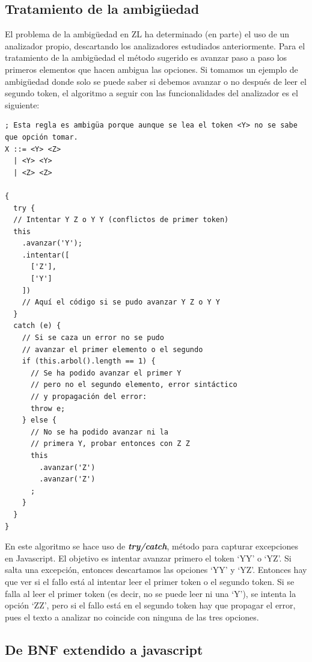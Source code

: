 \documentclass{report}
\begin{document}
	\subsection{Tratamiento de la ambigüedad}
	
	El problema de la ambigüedad en ZL ha determinado (en parte) el uso de un analizador propio, descartando los analizadores estudiados anteriormente. Para el tratamiento de la ambigüedad el método sugerido es avanzar paso a paso los primeros elementos que hacen ambigua las opciones. Si tomamos un ejemplo de ambigüedad donde solo se puede saber si debemos avanzar o no después de leer el segundo token, el algoritmo a seguir con las funcionalidades del analizador es el siguiente:
	
\begin{BVerbatim}
; Esta regla es ambigüa porque aunque se lea el token <Y> no se sabe que opción tomar.
X ::= <Y> <Z>
  | <Y> <Y>
  | <Z> <Z>

{
  try {
  // Intentar Y Z o Y Y (conflictos de primer token)
  this
    .avanzar('Y');
    .intentar([
      ['Z'],
      ['Y']
    ])
    // Aquí el código si se pudo avanzar Y Z o Y Y
  }
  catch (e) {
    // Si se caza un error no se pudo 
    // avanzar el primer elemento o el segundo
    if (this.arbol().length == 1) {
      // Se ha podido avanzar el primer Y 
      // pero no el segundo elemento, error sintáctico 
      // y propagación del error:
      throw e;
    } else {
      // No se ha podido avanzar ni la 
      // primera Y, probar entonces con Z Z
      this
        .avanzar('Z')
        .avanzar('Z')
      ;
    }
  }
}
\end{BVerbatim}

	En este algoritmo se hace uso de \textbf{\textit{try/catch}}, método para capturar excepciones en Javascript. El objetivo es intentar avanzar primero el token `YY' o `YZ'. Si salta una excepción, entonces descartamos las opciones `YY' y `YZ'. Entonces hay que ver si el fallo está al intentar leer el primer token o el segundo token. Si se falla al leer el primer token (es decir, no se puede leer ni una `Y'), se intenta la opción `ZZ', pero si el fallo está en el segundo token hay que propagar el error, pues el texto a analizar no coincide con ninguna de las tres opciones. 


	\subsection{De BNF extendido a javascript}
	
\end{document}
